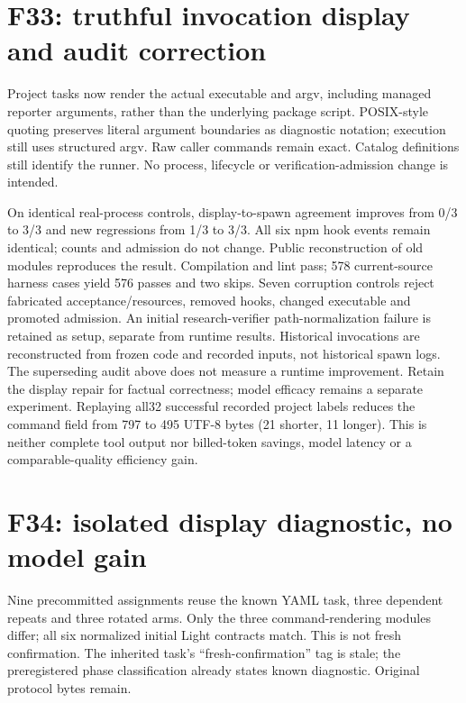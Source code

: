 \documentclass[11pt,a4paper]{article}
\begin{document}
\section{F33: truthful invocation display and audit correction}
Project tasks now render the actual executable and argv, including managed reporter
arguments, rather than the underlying package script. POSIX-style quoting preserves
literal argument boundaries as diagnostic notation; execution still uses structured
argv. Raw caller commands remain exact. Catalog definitions still identify the
runner. No process, lifecycle or verification-admission change is intended.

On identical real-process controls, display-to-spawn agreement improves from 0/3
to 3/3 and new regressions from 1/3 to 3/3. All six npm hook events remain
identical; counts and admission do not change. Public reconstruction of old modules
reproduces the result. Compilation and lint pass; 578 current-source harness cases
yield 576 passes and two skips. Seven corruption controls reject fabricated
acceptance/resources, removed hooks, changed executable and promoted admission.
An initial research-verifier path-normalization failure is retained as setup,
separate from runtime results. Historical invocations are reconstructed from frozen
code and recorded inputs, not historical spawn logs. The superseding audit above
does not measure a runtime improvement. Retain the display repair for factual
correctness; model efficacy remains a separate experiment.
Replaying all32 successful recorded project labels reduces the command field from
797 to 495 UTF-8 bytes (21 shorter, 11 longer). This is neither complete tool output
nor billed-token savings, model latency or a comparable-quality efficiency gain.

\section{F34: isolated display diagnostic, no model gain}
Nine precommitted assignments reuse the known YAML task, three dependent repeats
and three rotated arms. Only the three command-rendering modules differ; all six
normalized initial Light contracts match. This is not fresh confirmation. The
inherited task's ``fresh-confirmation'' tag is stale; the preregistered phase
classification already states known diagnostic. Original protocol bytes remain.
\end{document}

